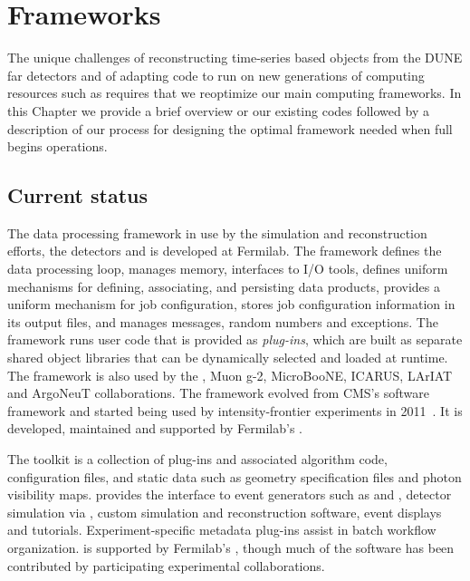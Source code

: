 \documentclass[../main-v1.tex]{subfiles}
\begin{document}
\chapter{Frameworks }
\label{ch:fworks}

The unique challenges of reconstructing time-series based objects from the DUNE far detectors and of adapting code to run on new generations of computing resources such as  requires that we reoptimize our main computing frameworks.  In this Chapter we provide a brief overview or our existing codes followed by a description of our process for designing the optimal framework needed when full  begins operations.  


\section{Current status }

The data processing framework in use by the  simulation and reconstruction efforts, the  detectors and  is  developed at Fermilab.  The  framework defines the data processing loop, manages memory, interfaces to I/O tools, defines uniform mechanisms for defining, associating, and persisting data products, provides a uniform mechanism for job configuration, stores job configuration information in its output files, and manages messages, random numbers and exceptions.  The  framework runs user code that is provided as {\it plug-ins}, which are built as separate shared object libraries that can be dynamically selected and loaded at runtime.  The  framework is also used by the , Muon g-2, MicroBooNE, ICARUS, LArIAT and ArgoNeuT collaborations.  The  framework evolved from CMS's software framework and started being used by intensity-frontier experiments in 2011~\cite{Green:2012gv}. It is developed, maintained and supported by Fermilab's .

The  toolkit is a collection of  plug-ins and associated algorithm code, configuration files, and static data such as geometry specification files and photon visibility maps.   provides the interface to event generators such as  and , detector simulation via , custom simulation and reconstruction software, event displays and tutorials.  Experiment-specific metadata plug-ins assist in batch workflow organization.   is supported by Fermilab's , though much of the software has been contributed by participating experimental collaborations.
\end{document}
